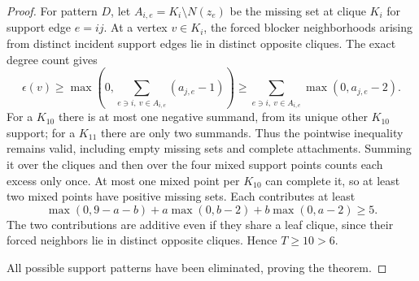 \begin{proof}
For pattern $D$, let $A_{i,e}=K_i\setminus N(z_e)$ be the missing set at clique $K_i$ for support edge $e=ij$. At a vertex $v\in K_i$, the forced blocker neighborhoods arising from distinct incident support edges lie in distinct opposite cliques. The exact degree count gives
\[
\epsilon(v)\geq
\max\left(0,\sum_{e\ni i,\ v\in A_{i,e}}(a_{j,e}-1)\right)
\geq
\sum_{e\ni i,\ v\in A_{i,e}}\max(0,a_{j,e}-2).
\]
For a $K_{10}$ there is at most one negative summand, from its unique other $K_{10}$ support; for a $K_{11}$ there are only two summands. Thus the pointwise inequality remains valid, including empty missing sets and complete attachments. Summing it over the cliques and then over the four mixed support points counts each excess only once. At most one mixed point per $K_{10}$ can complete it, so at least two mixed points have positive missing sets. Each contributes at least
\[
\max(0,9-a-b)+a\max(0,b-2)+b\max(0,a-2)\geq5.
\]
The two contributions are additive even if they share a leaf clique, since their forced neighbors lie in distinct opposite cliques. Hence $T\geq10>6$.

All possible support patterns have been eliminated, proving the theorem.
\end{proof}

